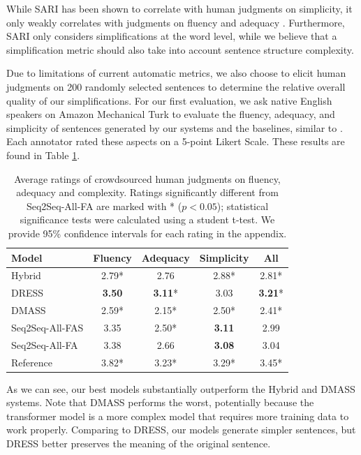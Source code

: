 \documentclass[thesis.tex]{subfiles}
\begin{document}
While SARI has been shown to correlate with human judgments on simplicity, it only weakly correlates with judgments on fluency and adequacy \citep{xu2016optimizing}. Furthermore, SARI only considers simplifications at the word level, while we believe that a simplification metric should also take into account sentence structure complexity.

Due to limitations of current automatic metrics, we also choose to elicit human judgments on 200 randomly selected sentences to determine the relative overall quality of our simplifications. For our first evaluation, we ask native English speakers on Amazon Mechanical Turk to evaluate the fluency, adequacy, and simplicity of sentences generated by our systems and the baselines, similar to \cite{zhang2017sentence}. Each annotator rated these aspects on a 5-point Likert Scale. These results are found in Table \ref{tab:sent_human}.

\begin{table}
\begin{center}
\begin{tabular}{|l|cccc|}
\hline
\textbf{Model} & \textbf{Fluency} & \textbf{Adequacy} & \textbf{Simplicity} & \textbf{All} \\ \hline
Hybrid & 2.79* & 2.76 & 2.88* & 2.81* \\
DRESS & \textbf{3.50} & \textbf{3.11}* & 3.03 & \textbf{3.21}* \\ 
DMASS & 2.59* & 2.15* & 2.50* & 2.41* \\ \hline
Seq2Seq-All-FAS & 3.35 & 2.50* & \textbf{3.11} & 2.99 \\
Seq2Seq-All-FA & 3.38 & 2.66 & \textbf{3.08} & 3.04 \\ \hline
Reference & 3.82* & 3.23* & 3.29* & 3.45* \\ \hline
\end{tabular}
\end{center}
\caption{\label{tab:sent_human} Average ratings of crowdsourced human judgments on fluency, adequacy and complexity. Ratings significantly different from Seq2Seq-All-FA are marked with * ($p < 0.05$); statistical significance tests were calculated using a student t-test. We provide 95\% confidence intervals for each rating in the appendix.}
\end{table}

As we can see, our best models substantially outperform the Hybrid and DMASS systems. Note that DMASS performs the worst, potentially because the transformer model is a more complex model that requires more training data to work properly. Comparing to DRESS, our models generate simpler sentences, but DRESS better preserves the meaning of the original sentence.
\end{document}
